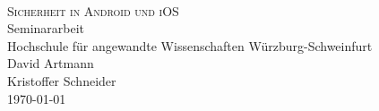 \begin{titlepage}
   	\mbox{}\vspace{5\baselineskip}\\
   	\rmfamily\huge
   	\centering
	\textsc{Sicherheit in Android und iOS}
	\\[3ex]
   	Seminararbeit
   	\rmfamily\Large
   	\vspace{1\baselineskip}\\
	\vspace{3\baselineskip}
	Hochschule für angewandte Wissenschaften Würzburg-Schweinfurt
   	\vspace{5\baselineskip}\\
   	\rmfamily\Large
   	David Artmann\\
   	\rmfamily\Large
   	Kristoffer Schneider
   	\vspace{1\baselineskip}\\
   	\today
\end{titlepage}